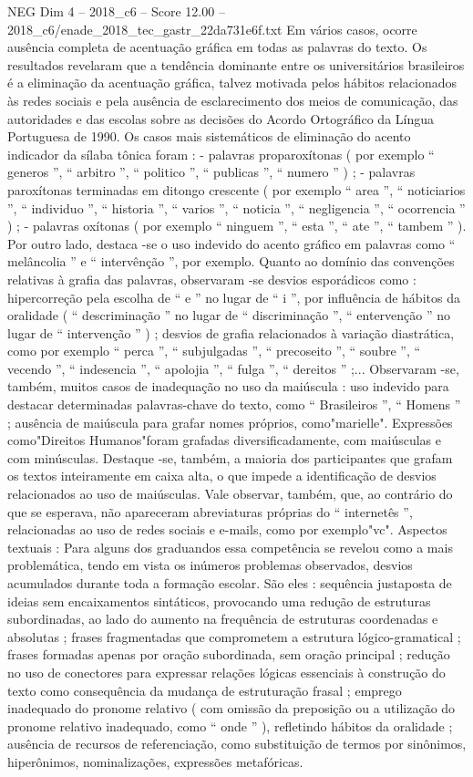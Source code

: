 \begin{textsample}{NEG Dim 4 – 2018\_c6 – Score 12.00 – 2018\_c6/enade\_2018\_tec\_gastr\_22da731e6f.txt}
Em vários casos, ocorre ausência completa de acentuação gráfica em todas as palavras do texto.
Os resultados revelaram que a tendência dominante entre os universitários brasileiros é a eliminação da acentuação gráfica, talvez motivada pelos hábitos relacionados às redes sociais e pela ausência de esclarecimento dos meios de comunicação, das autoridades e das escolas sobre as decisões do Acordo Ortográfico da Língua Portuguesa de 1990.
Os casos mais sistemáticos de eliminação do acento indicador da sílaba tônica foram : - palavras proparoxítonas ( por exemplo “ generos ”, “ arbitro ”, “ politico ”, “ publicas ”, “ numero ” ) ; - palavras paroxítonas terminadas em ditongo crescente ( por exemplo “ area ”, “ noticiarios ”, “ individuo ”, “ historia ”, “ varios ”, “ noticia ”, “ negligencia ”, “ ocorrencia ” ) ; - palavras oxítonas ( por exemplo “ ninguem ”, “ esta ”, “ ate ”, “ tambem ” ).
Por outro lado, destaca -se o uso indevido do acento gráfico em palavras como “ melâncolia ” e “ intervênção ”, por exemplo.
Quanto ao domínio das convenções relativas à grafia das palavras, observaram -se desvios esporádicos como : hipercorreção pela escolha de “ e ” no lugar de “ i ”, por influência de hábitos da oralidade ( “ descriminação ” no lugar de “ discriminação ”, “ entervenção ” no lugar de “ intervenção ” ) ; desvios de grafia relacionados à variação diastrática, como por exemplo “ perca ”, “ subjulgadas ”, “ precoseito ”, “ soubre ”, “ vecendo ”, “ indesencia ”, “ apolojia ”, “ fulga ”, “ dereitos ” ;...
Observaram -se, também, muitos casos de inadequação no uso da maiúscula : uso indevido para destacar determinadas palavras-chave do texto, como “ Brasileiros ”, “ Homens ” ; ausência de maiúscula para grafar nomes próprios, como"marielle".
Expressões como"Direitos Humanos"foram grafadas diversificadamente, com maiúsculas e com minúsculas.
Destaque -se, também, a maioria dos participantes que grafam os textos inteiramente em caixa alta, o que impede a identificação de desvios relacionados ao uso de maiúsculas.
Vale observar, também, que, ao contrário do que se esperava, não apareceram abreviaturas próprias do “ internetês ”, relacionadas ao uso de redes sociais e e-mails, como por exemplo"vc".
Aspectos textuais : Para alguns dos graduandos essa competência se revelou como a mais problemática, tendo em vista os inúmeros problemas observados, desvios acumulados durante toda a formação escolar.
São eles : sequência justaposta de ideias sem encaixamentos sintáticos, provocando uma redução de estruturas subordinadas, ao lado do aumento na frequência de estruturas coordenadas e absolutas ; frases fragmentadas que comprometem a estrutura lógico-gramatical ; frases formadas apenas por oração subordinada, sem oração principal ; redução no uso de conectores para expressar relações lógicas essenciais à construção do texto como consequência da mudança de estruturação frasal ; emprego inadequado do pronome relativo ( com omissão da preposição ou a utilização do pronome relativo inadequado, como “ onde ” ), refletindo hábitos da oralidade ; ausência de recursos de referenciação, como substituição de termos por sinônimos, hiperônimos, nominalizações, expressões metafóricas.

\end{textsample}
